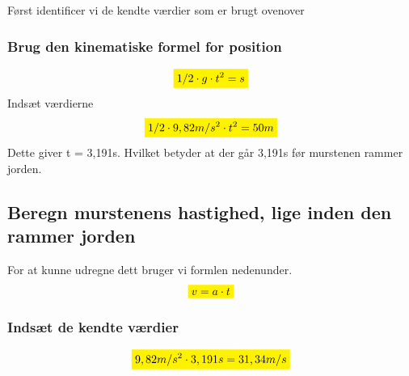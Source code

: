 Først identificer vi de kendte værdier som er brugt ovenover

\subsubsection{Brug den kinematiske formel for position}
\begin{equation*}
    \mathcolorbox{yellow}{1/2\cdot g\cdot t^{2}=s}
\end{equation*}
Indsæt værdierne
\begin{equation*}
    \mathcolorbox{yellow}{1/2\cdot9,82m/s^{2}\cdot t^{2}=50m}
\end{equation*}
Dette giver t = 3,191s. Hvilket betyder at der går 3,191s før murstenen rammer jorden.
\subsection{Beregn murstenens hastighed, lige inden den rammer jorden}
For at kunne udregne dett bruger vi formlen nedenunder.
\begin{equation*}
    \mathcolorbox{yellow}{v=a\cdot t}
\end{equation*}
\subsubsection{Indsæt de kendte værdier}
\begin{equation*}
    \mathcolorbox{yellow}{9,82m/s^{2}\cdot 3,191s = 31,34 m/s}
\end{equation*}


